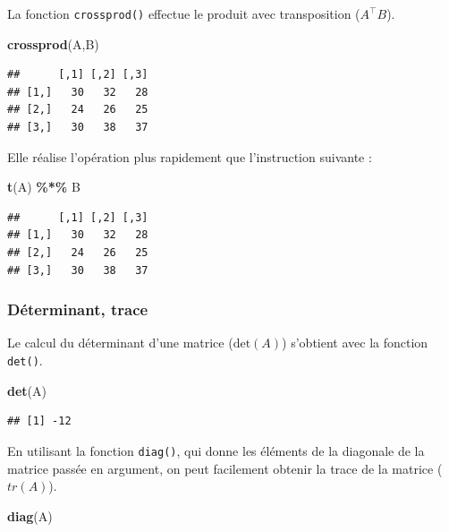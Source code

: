 \documentclass[
  11pt,
]{book}
\newenvironment{Shaded}{\begin{snugshade}}{\end{snugshade}}
\newcommand{\KeywordTok}[1]{\textcolor[rgb]{0.13,0.29,0.53}{\textbf{#1}}}
\newcommand{\NormalTok}[1]{#1}
\newcommand{\OperatorTok}[1]{\textcolor[rgb]{0.81,0.36,0.00}{\textbf{#1}}}
\newcommand{\StringTok}[1]{\textcolor[rgb]{0.31,0.60,0.02}{#1}}
\numberwithin{equation}{section}
\numberwithin{countremarque}{section}
\begin{document}
La fonction \texttt{crossprod()} effectue le produit avec transposition (\(A^\top B\)).

\begin{Shaded}
\begin{Highlighting}[]
\KeywordTok{crossprod}\NormalTok{(A,B)}
\end{Highlighting}
\end{Shaded}

\begin{lstlisting}
##      [,1] [,2] [,3]
## [1,]   30   32   28
## [2,]   24   26   25
## [3,]   30   38   37
\end{lstlisting}

Elle réalise l'opération plus rapidement que l'instruction suivante :

\begin{Shaded}
\begin{Highlighting}[]
\KeywordTok{t}\NormalTok{(A) }\OperatorTok{\%*\%}\StringTok{ }\NormalTok{B}
\end{Highlighting}
\end{Shaded}

\begin{lstlisting}
##      [,1] [,2] [,3]
## [1,]   30   32   28
## [2,]   24   26   25
## [3,]   30   38   37
\end{lstlisting}

\hypertarget{duxe9terminant-trace}{%
\subsubsection{Déterminant, trace}\label{duxe9terminant-trace}}

Le calcul du déterminant d'une matrice (\(\textrm{det}(A)\)) s'obtient avec la fonction \texttt{det()}.

\begin{Shaded}
\begin{Highlighting}[]
\KeywordTok{det}\NormalTok{(A)}
\end{Highlighting}
\end{Shaded}

\begin{lstlisting}
## [1] -12
\end{lstlisting}

En utilisant la fonction \texttt{diag()}, qui donne les éléments de la diagonale de la matrice passée en argument, on peut facilement obtenir la trace de la matrice (\(tr(A)\)).

\begin{Shaded}
\begin{Highlighting}[]
\KeywordTok{diag}\NormalTok{(A)}
\end{Highlighting}
\end{Shaded}
\end{document}

